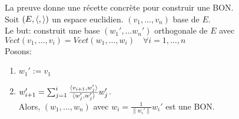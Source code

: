 \begin{remark}
   La preuve donne une récette concrète pour construir une BON.\\ 
   Soit $(E, \langle , \rangle)$ un espace euclidien.  $(v_1, \ldots, v_n)$ base de $E$.\\
   Le but: construit une base  $(w_1', \ldots w_n')$ orthogonale de $E$ avec  $Vect(v_1, \ldots, v_i) = Vect(w_1, \ldots, w_i) \quad \forall i = 1, \ldots, n$\\
   Posons:
   \begin{enumerate}
       \item $w_1' := v_1$
       \item $w_{i+1}' = \sum_{j=1}^{i} \frac{\langle v_{i+1}, w_j' \rangle}{\langle w_j', w_j' \rangle}w_j'$. \\
           Alors, $(w_1, \ldots, w_n)$ avec $w_i = \frac{1}{\|w_i'\|}w_i'$ est une BON.
   \end{enumerate}
\end{remark}
